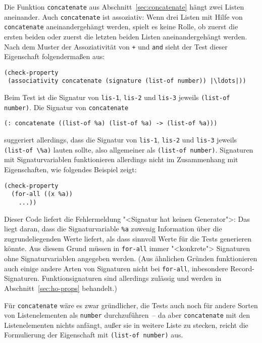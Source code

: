 Die Funktion
\lstinline{concatenate} aus
Abschnitt~\ref{sec:concatenate} hängt zwei Listen aneinander.  Auch
\lstinline{concatenate} ist assoziativ: Wenn drei Listen mit Hilfe von
\lstinline{concatenate} aneinandergehängt werden, spielt es keine Rolle,
ob zuerst die ersten beiden oder zuerst die letzten beiden Listen
aneinandergehängt werden.  Nach dem Muster der Assoziativität von
\lstinline{+} und \lstinline{and} sieht der Test dieser Eigenschaft
folgendermaßen aus:
%
\begin{lstlisting}
(check-property
 (associativity concatenate (signature (list-of number)) |\ldots|))
\end{lstlisting}
%
Beim Test ist die Signatur von \lstinline{lis-1}, \lstinline{lis-2} und
\lstinline{lis-3} jeweils \lstinline{(list-of number)}.  Die Signatur von \lstinline{concatenate}
%
\begin{lstlisting}
(: concatenate ((list-of %a) (list-of %a) -> (list-of %a)))
\end{lstlisting}
%
suggeriert allerdings, dass die Signatur von \lstinline{lis-1},
\lstinline{lis-2} und \lstinline{lis-3} jeweils \lstinline{(list-of \%a)} lauten
sollte, also allgemeiner als \lstinline{(list-of number)}.  Signaturen mit
Signaturvariablen funktionieren allerdings nicht im Zusammenhang mit
Eigenschaften, wie folgendes Beispiel zeigt:
%
\begin{lstlisting}
(check-property
  (for-all ((x %a))
    ...))
\end{lstlisting}
%
Dieser Code liefert die Fehlermeldung "<Signatur hat keinen
Generator">: Das liegt daran, dass die Signaturvariable \lstinline{%a}
zuwenig Information über die zugrundeliegenden Werte liefert, als dass
\drscheme{} sinnvoll Werte für die Tests generieren könnte.  Aus diesem
Grund müssen in \lstinline{for-all} immer "<konkrete"> Signaturen ohne
Signaturvariablen angegeben werden.  (Aus ähnlichen Gründen
funktionieren auch einige andere Arten von Signaturen nicht bei
\lstinline{for-all}, inbesondere Record-Signaturen.  Funktionsignaturen sind
allerdings zulässig und werden in Abschnitt~\ref{sec:ho-props} behandelt.)

Für \lstinline{concatenate} wäre es zwar gründlicher, die Tests auch noch
für andere Sorten von Listenelementen als \lstinline{number}
durchzuführen~-- da aber \lstinline{concatenate} mit den Listenelementen
nichts anfängt, außer sie in weitere Liste zu stecken, reicht die
Formulierung der Eigenschaft mit \lstinline{(list-of number)} aus.

